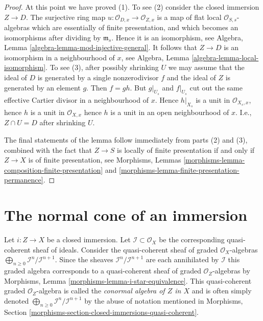 \begin{proof}
\medskip\noindent
At this point we have proved (1). To see (2) consider the closed
immersion $Z \to D$. The surjective ring map
$u : \mathcal{O}_{D, x} \to \mathcal{O}_{Z, x}$
is a map of flat local $\mathcal{O}_{S, s}$-algebras which
are essentially of finite presentation, and which becomes an
isomorphisms after dividing by $\mathfrak m_s$. Hence it is
an isomorphism, see
Algebra, Lemma \ref{algebra-lemma-mod-injective-general}.
It follows that $Z \to D$ is an isomorphism in a neighbourhood
of $x$, see
Algebra, Lemma \ref{algebra-lemma-local-isomorphism}.
To see (3), after possibly shrinking $U$ we may assume that
the ideal of $D$ is generated by a single nonzerodivisor $f$
and the ideal of $Z$ is generated by an element $g$. Then
$f = gh$. But $g|_{U_s}$ and $f|_{U_s}$ cut out the same
effective Cartier divisor in a neighbourhood of $x$. Hence
$h|_{X_s}$ is a unit in $\mathcal{O}_{X_s, x}$, hence $h$ is
a unit in $\mathcal{O}_{X, x}$ hence $h$ is a unit in an
open neighbourhood of $x$. I.e., $Z \cap U = D$ after shrinking $U$.

\medskip\noindent
The final statements of the lemma follow immediately from
parts (2) and (3), combined with the fact that $Z \to S$
is locally of finite presentation if and only if $Z \to X$ is
of finite presentation, see
Morphisms, Lemmas \ref{morphisms-lemma-composition-finite-presentation} and
\ref{morphisms-lemma-finite-presentation-permanence}.
\end{proof}

\section{The normal cone of an immersion}
\label{divisors-section-normal-cone}
Let $i : Z \to X$ be a closed immersion. Let
$\mathcal{I} \subset \mathcal{O}_X$ be the corresponding quasi-coherent
sheaf of ideals. Consider the quasi-coherent sheaf of graded
$\mathcal{O}_X$-algebras
$\bigoplus_{n \geq 0} \mathcal{I}^n/\mathcal{I}^{n + 1}$.
Since the sheaves $\mathcal{I}^n/\mathcal{I}^{n + 1}$
are each annihilated by $\mathcal{I}$ this graded algebra
corresponds to a quasi-coherent sheaf of graded $\mathcal{O}_Z$-algebras
by
Morphisms, Lemma \ref{morphisms-lemma-i-star-equivalence}.
This quasi-coherent graded $\mathcal{O}_Z$-algebra is called the
{\it conormal algebra of $Z$ in $X$} and is often simply denoted
$\bigoplus_{n \geq 0} \mathcal{I}^n/\mathcal{I}^{n + 1}$
by the abuse of notation mentioned in
Morphisms, Section \ref{morphisms-section-closed-immersions-quasi-coherent}.


